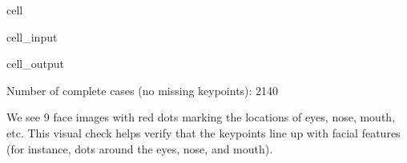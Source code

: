 \documentclass[letterpaper,10pt,english]{jupyterBook}
\begin{document}
\begin{sphinxuseclass}{cell}
\begin{sphinxVerbatimInput}
\begin{sphinxuseclass}{cell_input}
\begin{sphinxVerbatim}[commandchars=\\\{\}]
      
  
   
    \PYG{p}{[}\PYG{p}{]}\PYG{p}{[}\PYG{p}{]} 
      \PYG{p}{[}\PYG{p}{]}
    \PYG{p}{[}\PYG{p}{]}\PYG{p}{[}\PYG{p}{]} \PYG{p}{[}\PYG{p}{]}  
    \PYG{p}{[}\PYG{p}{]}
\end{sphinxVerbatim}

\end{sphinxuseclass}\end{sphinxVerbatimInput}
\begin{sphinxVerbatimOutput}

\begin{sphinxuseclass}{cell_output}
\begin{sphinxVerbatim}[commandchars=\\\{\}]
Number of complete cases (no missing keypoints): 2140
\end{sphinxVerbatim}

\noindent{}

\end{sphinxuseclass}\end{sphinxVerbatimOutput}

\end{sphinxuseclass}
\sphinxAtStartPar
We see 9 face images with red dots marking the locations of eyes, nose, mouth, etc. This visual check helps verify that the keypoints line up with facial features (for instance, dots around the eyes, nose, and mouth).
\end{document}
